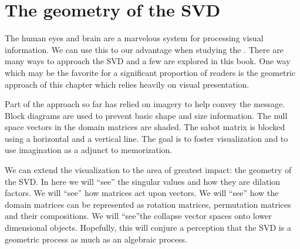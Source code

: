 \chapter{The geometry of the SVD}

The human eyes and brain are a marvelous system for processing visual information. We can use this to our advantage when studying the \svdp. There are many ways to approach the SVD and a few are explored in this book. One way which may be the favorite for a significant proportion of readers is the geometric approach of this chapter which relies heavily on visual presentation.

Part of the approach so far has relied on imagery to help convey the message. Block diagrams are used to prevent basic shape and size information. The null space vectors in the domain matrices are shaded. The sabot matrix is blocked using a horizontal and a vertical line. The goal is to foster visualization and to use imagination as a adjunct to memorization. 

We can extend the visualization to the area of greatest impact: the geometry of the SVD. In here we will ``see'' the singular values and how they are dilation factors. We will ``see'' how matrices act upon vectors. We will ``see'' how the domain matrices can be represented as rotation matrices, permutation matrices and their compositions. We will ``see''the collapse vector spaces onto lower dimensional objects. Hopefully, this will conjure a perception that the SVD is a geometric process as much as an algebraic process.
 




\endinput